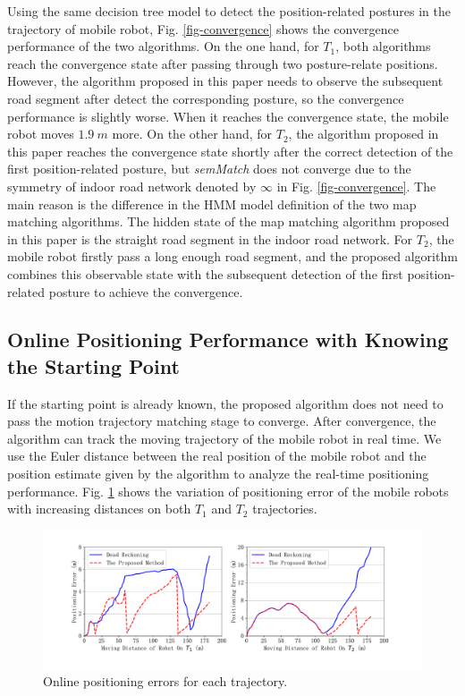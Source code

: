 \documentclass{llncs}
\begin{document}
Using the same decision tree model to detect the position-related postures in the trajectory of mobile robot, Fig. \ref{fig-convergence} shows the convergence performance of the two algorithms. On the one hand, for $T_1$, both algorithms reach the convergence state after passing through two posture-relate positions. However, the algorithm proposed in this paper needs to observe the subsequent road segment after detect the corresponding posture, so the convergence performance is slightly worse. When it reaches the convergence state, the mobile robot moves $1.9\ m$ more. On the other hand, for $T_2$, the algorithm proposed in this paper reaches the convergence state shortly after the correct detection of the first position-related posture, but \emph{semMatch} does not converge due to the symmetry of indoor road network denoted by $\infty$ in Fig. \ref{fig-convergence}. The main reason is the difference in the HMM model definition of the two map matching algorithms. The hidden state of the map matching algorithm proposed in this paper is the straight road segment in the indoor road network. For $T_2$, the mobile robot firstly pass a long enough road segment, and the proposed algorithm combines this observable state with the subsequent detection of the first position-related posture to achieve the convergence.


\subsection{Online Positioning Performance with Knowing the Starting Point}

If the starting point is already known, the proposed algorithm does not need to pass the motion trajectory matching stage to converge. After convergence, the algorithm can track the moving trajectory of the mobile robot in real time. We use the Euler distance between the real position of the mobile robot and the position estimate given by the algorithm to analyze the real-time positioning performance. Fig. \ref{fig-online} shows the variation of positioning error of the mobile robots with increasing distances on both $T_1$ and $T_2$ trajectories.

\begin{figure}[!htbp]
	\centering
	\includegraphics[width=5.076in]{RobotMatch-OnlineError}
	\caption{Online positioning errors for each trajectory.}
	\label{fig-online}
\end{figure}
\end{document}

